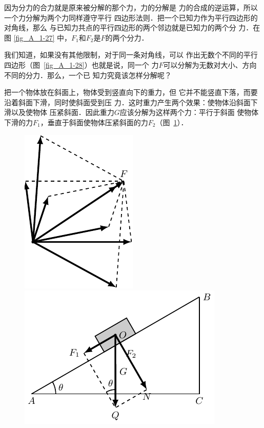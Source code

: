     因为分力的合力就是原来被分解的那个力，力的分解是
力的合成的逆运算，所以一个力分解为两个力同样遵守平行
四边形法则．把一个已知力作为平行四边形的对角线，那么
与已知力共点的平行四边形的两个邻边就是已知力的两个分
力．在图 \ref{fig_A_1-27} 中，$F_1$和$F_2$是$F$的两个分力．


    我们知道，如果没有其他限制，对于同一条对角线，可以
作出无数个不同的平行四边形（图~\ref{fig_A_1-28}）也就是说，同一个
力$F$可以分解为无数对大小、方向不同的分力．那么，一个已
知力究竟该怎样分解呢？

    把一个物体放在斜面上，物体受到竖直向下的重力，但
它并不能竖直下落，而要沿着斜面下滑，同时使斜面受到压
力．这时重力产生两个效果：使物体沿斜面下滑以及使物体
压紧斜面．因此重力$G$应该分解为这样两个力：平行于斜面
使物体下滑的力$F_1$，垂直于斜面使物体压紧斜面的力$F_2$（图~\ref{fig_A_1-29}）．


\begin{figure} [htp]
\centering
\begin{minipage} [t]{0.48\textwidth} 
\centering
\includegraphics{fig/A/1-28.pdf} 
\caption{} \label{fig_A_1-28} 
\end{minipage} 
\begin{minipage} [t]{0.48\textwidth} 
\centering
\includegraphics{fig/A/1-29.pdf} 
\caption{} \label{fig_A_1-29} 
\end{minipage} 
\end{figure} 

